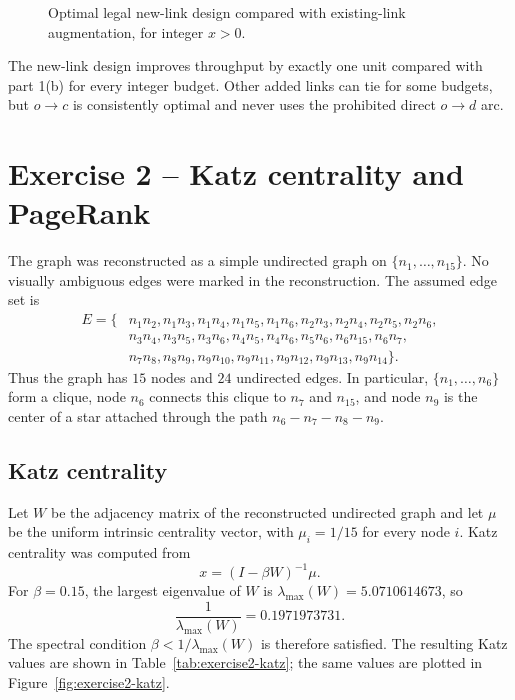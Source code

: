 \documentclass[11pt,a4paper]{article}
\begin{document}
\begin{figure}[h]
\centering

\caption{Optimal legal new-link design compared with existing-link augmentation,
for integer \(x>0\).}
\label{fig:exercise1-c-throughput}
\end{figure}

The new-link design improves throughput by exactly one unit compared with
part 1(b) for every integer budget. Other added links can tie for some
budgets, but \(o\to c\) is consistently optimal and never uses the
prohibited direct \(o\to d\) arc.

\section{Exercise 2 -- Katz centrality and PageRank}

The graph was reconstructed as a simple undirected graph on
\(\{n_1,\ldots,n_{15}\}\). No visually ambiguous edges were marked in the
reconstruction. The assumed edge set is
\[
\begin{aligned}
E=\{&
n_1n_2,n_1n_3,n_1n_4,n_1n_5,n_1n_6,
n_2n_3,n_2n_4,n_2n_5,n_2n_6,\\
&n_3n_4,n_3n_5,n_3n_6,
n_4n_5,n_4n_6,n_5n_6,
n_6n_{15},n_6n_7,\\
&n_7n_8,n_8n_9,
n_9n_{10},n_9n_{11},n_9n_{12},n_9n_{13},n_9n_{14}\}.
\end{aligned}
\]
Thus the graph has \(15\) nodes and \(24\) undirected edges. In particular,
\(\{n_1,\ldots,n_6\}\) form a clique, node \(n_6\) connects this clique to
\(n_7\) and \(n_{15}\), and node \(n_9\) is the center of a star attached
through the path \(n_6-n_7-n_8-n_9\).

\subsection*{Katz centrality}

Let $W$ be the adjacency matrix of the reconstructed undirected graph and let
$\mu$ be the uniform intrinsic centrality vector, with $\mu_i=1/15$ for every node $i$. Katz centrality was computed
from
\[
x=(I-\beta W)^{-1}\mu .
\]
For \(\beta=0.15\), the largest eigenvalue of \(W\) is
\(\lambda_{\max}(W)=5.0710614673\), so
\[
\frac{1}{\lambda_{\max}(W)}=0.1971973731.
\]
The spectral condition \(\beta<1/\lambda_{\max}(W)\) is therefore satisfied.
The resulting Katz values are shown in Table~\ref{tab:exercise2-katz}; the same
values are plotted in Figure~\ref{fig:exercise2-katz}.
\end{document}
